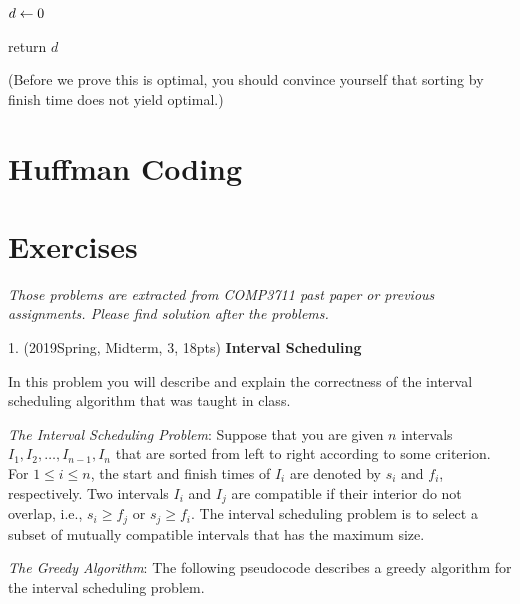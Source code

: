 \begin{spacing}{1.3}
\begin{algorithm*}[htbp]
        $d\leftarrow 0$\quad {}

        return $d$
    \end{algorithm*}

    (Before we prove this is optimal, you should convince yourself that sorting by 
    finish time does not yield optimal.)

    



    \section{Huffman Coding}



    \newpage
    \section{Exercises}

    {\it Those problems are extracted from COMP3711 past paper or previous assignments. 
    Please find solution after the problems.}

    1. (2019Spring, Midterm, 3, 18pts) {\bf Interval Scheduling}
    
    In this problem you will describe and explain the correctness of the interval scheduling algorithm that was taught in class.
    
    {\it The Interval Scheduling Problem}: Suppose that you are given $n$ intervals $I_{1}, I_{2}, \ldots, I_{n-1}, I_{n}$ that are sorted from left to right according to some criterion. For $1 \leq i \leq n$, the start and finish times of $I_{i}$ are denoted by $s_{i}$ and $f_{i}$, respectively. Two intervals $I_{i}$ and $I_{j}$ are compatible if their interior do not overlap, i.e., $s_{i} \geq f_{j}$ or $s_{j} \geq f_{i}$. The interval scheduling problem is to select a subset of mutually compatible intervals that has the maximum size.
    
    {\it The Greedy Algorithm}: The following pseudocode describes a greedy algorithm for the interval scheduling problem.
    

\end{spacing}
